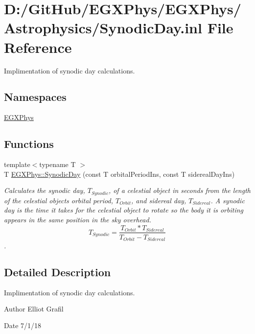 \hypertarget{_synodic_day_8inl}{}\section{D\+:/\+Git\+Hub/\+E\+G\+X\+Phys/\+E\+G\+X\+Phys/\+Astrophysics/\+Synodic\+Day.inl File Reference}
\label{_synodic_day_8inl}


Implimentation of synodic day calculations.  


\subsection*{Namespaces}
\begin{DoxyCompactItemize}
\item 
 \mbox{\hyperlink{namespace_e_g_x_phys}{E\+G\+X\+Phys}}
\end{DoxyCompactItemize}
\subsection*{Functions}
\begin{DoxyCompactItemize}
\item 
{\footnotesize template$<$typename T $>$ }\\T \mbox{\hyperlink{group___e_g_x_phys-_astrophysic-_synodic_day_ga637140842bc008c87d90e65b551cbac7}{E\+G\+X\+Phys\+::\+Synodic\+Day}} (const T orbital\+Period\+Ins, const T sidereal\+Day\+Ins)
\begin{DoxyCompactList}\small\item\em Calculates the synodic day, $T_{Synodic}$, of a celestial object in seconds from the length of the celestial object\textquotesingle{}s orbital period, $T_{Orbit}$, and sidereal day, $T_{Sidereal}$. A synodic day is the time it takes for the celestial object to rotate so the body it is orbiting appears in the same position in the sky overhead. \[ T_{Synodic}=\dfrac{T_{Orbit} * T_{Sidereal}}{T_{Orbit} - T_{Sidereal}}\]. \end{DoxyCompactList}\end{DoxyCompactItemize}


\subsection{Detailed Description}
Implimentation of synodic day calculations. 

\begin{DoxyAuthor}{Author}
Elliot Grafil 
\end{DoxyAuthor}
\begin{DoxyDate}{Date}
7/1/18 
\end{DoxyDate}
